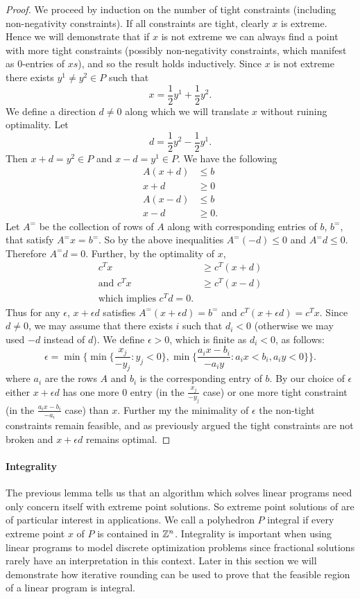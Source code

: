 \begin{proof}
We proceed by induction on the number of tight constraints (including non-negativity constraints). If all constraints are tight, clearly $x$ is extreme. Hence we will demonstrate that if $x$ is not extreme we can always find a point with more tight constraints (possibly non-negativity constraints, which manifest as $0$-entries of $xs$), and so the result holds inductively. Since $x$ is not extreme there exists $y^1 \neq y^2 \in P$ such that $$x = \frac{1}{2} y^1 + \frac{1}{2}y^2.$$
We define a direction $d\neq 0$ along which we will translate $x$ without ruining optimality. Let
$$ d = \frac{1}{2}y^2 - \frac{1}{2} y^1.$$
Then $x + d = y^2 \in P$ and $x - d = y^1 \in P$. We have the following
\begin{align*} A(x+d) &\leq b \\ x+d &\geq 0 \\
A(x-d) &\leq b \\ x-d &\geq 0 .\end{align*}
Let $A^=$ be the collection of rows of $A$ along with corresponding entries of $b$, $b^=$, that satisfy $A^= x = b^=$. So by the above inequalities $A^=(-d) \leq 0$ and $A^=d \leq 0$. Therefore $A^=d = 0$. Further, by the optimality of $x$,
\begin{align*}
c^Tx &\geq c^T(x+d) \\
\text{and } c^Tx &\geq c^T(x-d) \\
\text{which implies } c^Td = 0.
\end{align*}
Thus for any $\epsilon$, $x+\epsilon d$ satisfies $A^=(x+\epsilon d) = b^=$ and $c^T(x+\epsilon d) = c^Tx$. Since $d \neq 0$, we may assume that there exists $i$ such that $d_i < 0$ (otherwise we may used $-d$ instead of $d$). We define $\epsilon > 0$, which is finite as $d_i < 0$, as follows:
$$ \epsilon = \min\{ \min\{\frac{x_j}{-y_j}: y_j < 0\}, \min \{\frac{a_i x - b_i}{-a_iy}: a_i x < b_i, a_i y < 0 \}\}.$$
where $a_i$ are the rows $A$ and $b_i$ is the corresponding entry of $b$. By our choice of $\epsilon$ either $x+\epsilon d$ has one more $0$ entry (in the $\frac{x_j}{-y_j}$ case) or one more tight constraint (in the $\frac{a_i x - b_i}{-a_i}$ case) than $x$. Further my the minimality of $\epsilon$ the non-tight constraints remain feasible, and as previously argued the tight constraints are not broken and $x + \epsilon d$ remains optimal.
\end{proof}
\paragraph{Integrality}
The previous lemma tells us that an algorithm which solves linear programs need only concern itself with extreme point solutions. So extreme point solutions of are of particular interest in applications. We call a polyhedron $P$ integral if every extreme point $x$ of $P$ is contained in $\mathbb{Z}^n$. Integrality is important when using linear programs to model discrete optimization problems since fractional solutions rarely have an interpretation in this context. Later in this section we will demonstrate how iterative rounding can be used to prove that the feasible region of a linear program is integral.
